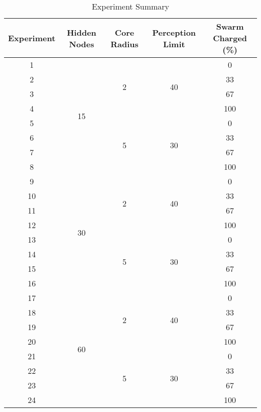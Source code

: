 \begin{table}
  \centering
  \begin{tabular}{|c|c|c|c|c|}
    \hline
    Experiment & Hidden Nodes & Core Radius & Perception Limit & Swarm Charged (\%) \\
    \hline
    1 & \multirow{ 8}{*}{15}  & \multirow{ 4}{*}{2} & \multirow{ 4}{*}{40} & 0 \\
    2 & & & & 33\\
    3 & & & & 67\\
    4 & & & & 100\\ \cline{3-5}
    5 & & \multirow{ 4}{*}{5} & \multirow{ 4}{*}{30} & 0 \\
    6 & & & & 33\\
    7 & & & & 67\\
    8 & & & & 100\\ \cline{2-5}
    9 & \multirow{ 8}{*}{30}  & \multirow{ 4}{*}{2} & \multirow{ 4}{*}{40} & 0 \\
    10 & & & & 33\\
    11 & & & & 67\\
    12 & & & & 100\\ \cline{3-5}
    13 & & \multirow{ 4}{*}{5} & \multirow{ 4}{*}{30} & 0 \\
    14 & & & & 33\\
    15 & & & & 67\\
    16 & & & & 100\\ \cline{2-5}
    17 & \multirow{ 8}{*}{60}  & \multirow{ 4}{*}{2} & \multirow{ 4}{*}{40} & 0 \\
    18 & & & & 33\\
    19 & & & & 67\\
    20 & & & & 100\\ \cline{3-5}
    21 & & \multirow{ 4}{*}{5} & \multirow{ 4}{*}{30} & 0 \\
    22 & & & & 33\\
    23 & & & & 67\\
    24 & & & & 100\\
    \hline
  \end{tabular}
  \caption{Experiment Summary}
  \label{tab:experiment-labels-1}
\end{table}